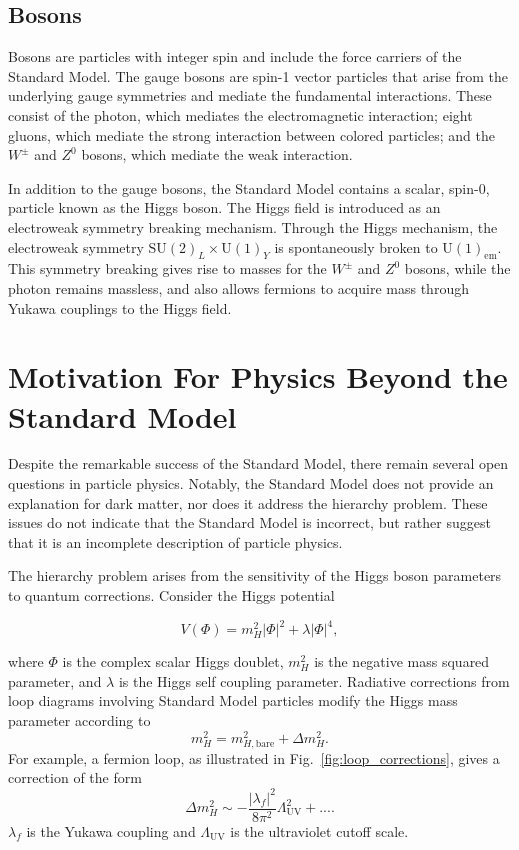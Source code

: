 \subsection{Bosons}
Bosons are particles with integer spin and include the force carriers of the Standard Model. The gauge bosons are spin-1 vector particles that arise from the underlying gauge symmetries and mediate the fundamental interactions. These consist of the photon, which mediates the electromagnetic interaction; eight gluons, which mediate the strong interaction between colored particles; and the $W^\pm$ and $Z^0$ bosons, which mediate the weak interaction.

In addition to the gauge bosons, the Standard Model contains a scalar, spin-0, particle known as the Higgs boson. The Higgs field is introduced as an electroweak symmetry breaking mechanism. Through the Higgs mechanism, the electroweak symmetry $\mathrm{SU}(2)_L \times \mathrm{U}(1)_Y$ is spontaneously broken to $\mathrm{U}(1)_{\mathrm{em}}$. This symmetry breaking gives rise to masses for the $W^\pm$ and $Z^0$ bosons, while the photon remains massless, and also allows fermions to acquire mass through Yukawa couplings to the Higgs field.




\section{Motivation For Physics Beyond the Standard Model}


Despite the remarkable success of the Standard Model, there remain several open questions in particle physics. Notably, the Standard Model does not provide an explanation for dark matter, nor does it address the hierarchy problem. These issues do not indicate that the Standard Model is incorrect, but rather suggest that it is an incomplete description of particle physics.



The hierarchy problem arises from the sensitivity of the Higgs boson parameters to quantum corrections. Consider the Higgs potential

\begin{equation}
    V(\Phi) = m_H^2 |\Phi|^2 + \lambda |\Phi|^4,
\end{equation}

where $\Phi$ is the complex scalar Higgs doublet, $m_H^2$ is the negative mass squared parameter, and $\lambda$ is the Higgs self coupling parameter. Radiative corrections from loop diagrams involving Standard Model particles modify the Higgs mass parameter according to
\[
m_H^2 = m_{H,\mathrm{bare}}^2 + \Delta m_H^2 .
\]
For example, a fermion loop, as illustrated in Fig.~\ref{fig:loop_corrections}, gives a correction of the form
\begin{equation}
    \Delta m_H^2 \sim -\frac{|\lambda_f|^2}{8\pi^2} \Lambda_{\mathrm{UV}}^2 + ....
\end{equation} 
$\lambda_f$ is the Yukawa coupling and $\Lambda_{\mathrm{UV}}$ is the ultraviolet cutoff scale.

